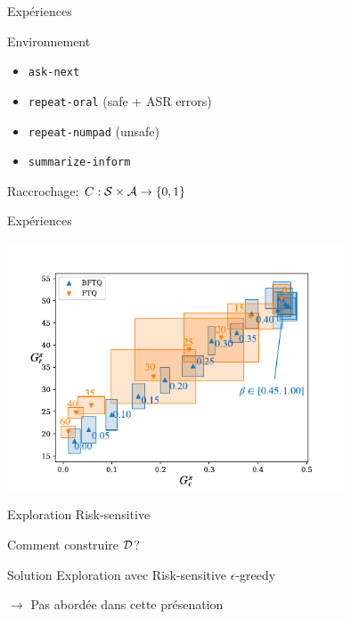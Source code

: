 \documentclass[french,handout]{beamer}
\begin{document}
    \begin{frame}{Expériences}

        \begin{block}{Environnement}
            \begin{itemize}
                \item \texttt{ask-next}%
                \item \texttt{repeat-oral} (safe + ASR errors)%
                \item \texttt{repeat-numpad} (unsafe)%
                \item \texttt{summarize-inform}
            \end{itemize}

            Raccrochage: $C: \mathcal{S}\times\mathcal{A} \rightarrow \{0,1\}$

        \end{block}
    \end{frame}

    \begin{frame}{Expériences}
        \begin{center}
            \includegraphics[width=0.75\textwidth]{img/slot-filling.pdf}
        \end{center}
    \end{frame}

    \begin{frame}{Exploration Risk-sensitive}

        Comment construire $\mathcal{D}$?

        \begin{exampleblock}{Solution}
            Exploration avec Risk-sensitive $\epsilon$-greedy
        \end{exampleblock}
            $\rightarrow$ Pas abordée dans cette présenation
    \end{frame}
\end{document}

